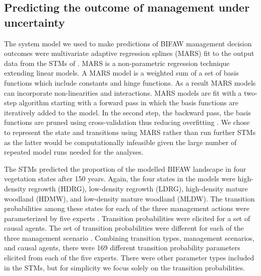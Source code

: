 \documentclass[draft]{article}
\theoremstyle{definition}
\theoremstyle{definition}
\theoremstyle{definition}
\theoremstyle{remark}
\begin{document}
\subsection*{Predicting the outcome of management under
uncertainty}\label{predicting-the-outcome-of-management-under-uncertainty}

The system model we used to make predictions of BIFAW management
decision outcomes were multivariate adaptive regression splines (MARS)
fit to the output data from the STMs of \citet{Czembor2011}. MARS is a
non-parametric regression technique extending linear models. A MARS
model is a weighted sum of a set of basis functions which include
constants and hinge functions. As a result MARS models can incorporate
non-linearities and interactions. MARS models are fit with a two-step
algorithm starting with a forward pass in which the basis functions are
iteratively added to the model. In the second step, the backward pass,
the basis functions are pruned using cross-validation thus reducing
overfitting \citep{Friedman1991}. We chose to represent the state and
transitions using MARS rather than run further STMs as the latter would
be computationally infeasible given the large number of repeated model
runs needed for the analyses.

The STMs predicted the proportion of the modelled BIFAW landscape in
four vegetation states after 150 years. Again, the four states in the
models were high-density regrowth (HDRG), low-density regrowth (LDRG),
high-density mature woodland (HDMW), and low-density mature woodland
(MLDW). The transition probabilities among these states for each of the
three management actions were parameterized by five experts
\citep{Czembor2009}. Transition probabilities were elicited for a set of
causal agents. The set of transition probabilities were different for
each of the three management scenario \citep[see Table 1
in][]{Czembor2009}. Combining transition types, management scenarios,
and causal agents, there were 169 different transition probability
parameters elicited from each of the five experts. There were other
parameter types included in the STMs, but for simplicity we focus solely
on the transition probabilities.
\end{document}
